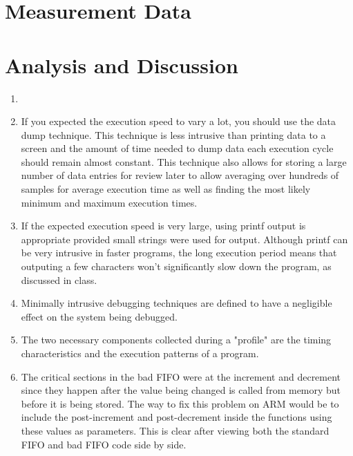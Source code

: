 \documentclass{article}
\begin{document}
\section{Measurement Data} %


\section{Analysis and Discussion}

\begin{enumerate}
	\item %
		

	\item %
		If you expected the execution speed to vary a lot, you should use the data dump technique. This technique is less intrusive than printing data to a screen and the amount of time needed to dump data each execution cycle should remain almost constant. This technique also allows for storing a large number of data entries for review later to allow averaging over hundreds of samples for average execution time as well as finding the most likely minimum and maximum execution times.

	\item %
		If the expected execution speed is very large, using printf output is appropriate provided small strings were used for output. Although printf can be very intrusive in faster programs, the long execution period means that outputing a few characters won't significantly slow down the program, as discussed in class.

	\item %
		Minimally intrusive debugging techniques are defined to have a negligible effect on the system being debugged.

	\item %
		The two necessary components collected during a "profile" are the timing characteristics and the execution patterns of a program.

	\item %
		The critical sections in the bad FIFO were at the increment and decrement since they happen after the value being changed is called from memory but before it is being stored. The way to fix this problem on ARM would be to include the post-increment and post-decrement inside the functions using these values as parameters. This is clear after viewing both the standard FIFO and bad FIFO code side by side.

\end{enumerate}
\end{document}
